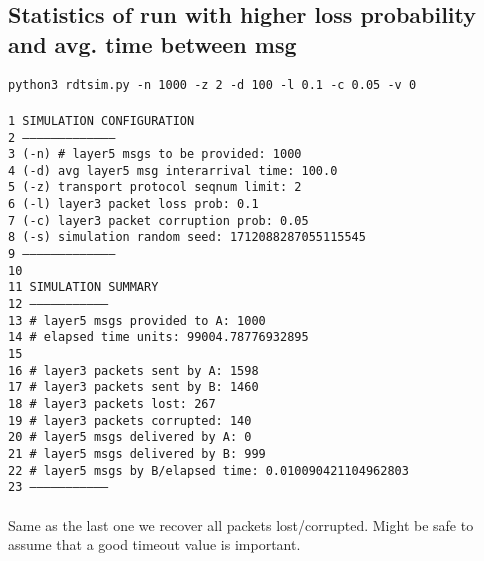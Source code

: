 \documentclass{article}
\begin{document}
\subsection{Statistics of run with higher loss probability and avg. time between msg}
\hspace*{10mm} \texttt{python3 rdtsim.py -n 1000 -z 2 -d 100 -l 0.1 -c 0.05 -v 0}
\texttt{\\\\1 SIMULATION CONFIGURATION\\
2 --------------------------------------\\
3 (-n) \# layer5 msgs to be provided:      1000\\
4 (-d) avg layer5 msg interarrival time:  100.0\\
5 (-z) transport protocol seqnum limit:   2\\
6 (-l) layer3 packet loss prob:           0.1\\
7 (-c) layer3 packet corruption prob:     0.05\\
8 (-s) simulation random seed:            1712088287055115545\\
9 --------------------------------------\\
10 \\
11 SIMULATION SUMMARY\\
12 --------------------------------\\
13 \# layer5 msgs provided to A:      1000\\
14 \# elapsed time units:             99004.78776932895\\
15 \\
16 \# layer3 packets sent by A:       1598\\
17 \# layer3 packets sent by B:       1460\\
18 \# layer3 packets lost:            267\\
19 \# layer3 packets corrupted:       140\\
20 \# layer5 msgs delivered by A:     0\\
21 \# layer5 msgs delivered by B:     999\\
22 \# layer5 msgs by B/elapsed time:  0.010090421104962803\\
23 --------------------------------\\
}
\\Same as the last one we recover all packets lost/corrupted. Might be safe to assume that a good timeout value is important.
\end{document}
